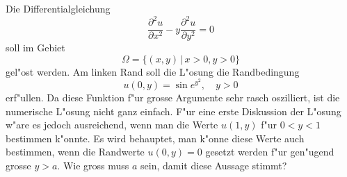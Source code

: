 Die Differentialgleichung
\begin{equation}
\frac{\partial^2 u}{\partial x^2}
-
y\frac{\partial^2 u}{\partial y^2}
=
0
\label{90000009:dgl}
\end{equation}
soll im Gebiet
\[
\Omega = \{(x,y) \,|\, x > 0, y > 0\}
\]
gel"ost werden.
Am linken Rand soll die L"osung die Randbedingung
\[
u(0, y)=\sin e^{y^2},\quad y>0
\]
erf"ullen.
Da diese Funktion f"ur grosse Argumente sehr rasch oszilliert,
ist die numerische L"osung nicht ganz einfach.
F"ur eine erste Diskussion der L"osung w"are es jedoch ausreichend,
wenn man die Werte $u(1,y)$ f"ur $0<y<1$ bestimmen k"onnte.
Es wird behauptet, man k"onne diese Werte auch bestimmen,
wenn die Randwerte $u(0,y)=0$
gesetzt werden f"ur gen"ugend grosse $y>a$. Wie gross muss $a$
sein, damit diese Aussage stimmt?

